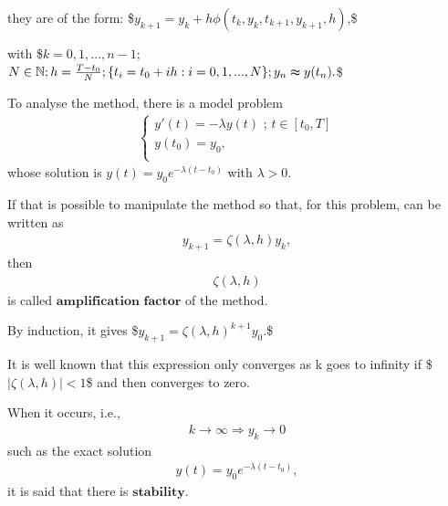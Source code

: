 \documentclass[letterpaper,10pt,english]{jupyterBook}
\begin{document}
\sphinxAtStartPar
they are of the form:
\$\(
y_{k+1} = y_{k} + h \phi (t_{k},y_{k},t_{k+1},y_{k+1},h) \text{,}
\)\$

\sphinxAtStartPar
with \$\(k = 0, 1, ..., n-1;\)\(
\)\(
N \in \mathbb{N}; h = \frac{T-t_0}{N}; \\
\{t_i = t_0 + ih : i = 0, 1, ..., N\}; \\ 
y_n \thickapprox y(t_n) .
\)\$

\sphinxAtStartPar
To analyse the method, there is a model problem
\begin{equation*}
\begin{split}
\begin{cases}
    y'(t) = - \lambda y(t) \text{ ; } t \in[t_0,T]\\ 
    y(t_0)=y_0,\\
\end{cases}
\end{split}
\end{equation*}
\sphinxAtStartPar
whose solution is \(y(t) = y_0 e^{-\lambda (t-t_0)}\)
with \(\lambda > 0.\)

\sphinxAtStartPar
If that is possible to manipulate the method so that, for this problem, can be written as
\begin{equation*}
\begin{split}
y_{k+1} = \zeta(\lambda,h) y_k,
\end{split}
\end{equation*}
\sphinxAtStartPar
then
\begin{equation*}
\begin{split}\zeta(\lambda,h)\end{split}
\end{equation*}
\sphinxAtStartPar
is called \(\textbf{amplification factor}\) of the method.

\sphinxAtStartPar
By induction, it gives
\$\(
y_{k+1} = \zeta(\lambda, h)^{k+1} y_0.
\)\$

\sphinxAtStartPar
It is well known that this expression only converges as k goes to infinity if
\$\(
|\zeta(\lambda, h)| < 1
\)\$
and then converges to zero.

\sphinxAtStartPar
When it occurs, i.e.,
\begin{equation*}
\begin{split}
    k \rightarrow \infty \Rightarrow y_k \rightarrow 0
\end{split}
\end{equation*}
\sphinxAtStartPar
such as the exact solution
\begin{equation*}
\begin{split}
    y(t) = y_0 e^{-\lambda (t-t_0)},
\end{split}
\end{equation*}
\sphinxAtStartPar
it is said that there is \(\textbf{stability}\).
\end{document}
